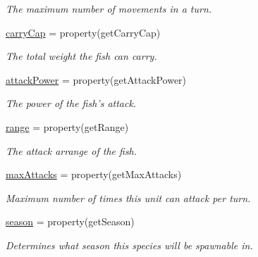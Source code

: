 \begin{DoxyCompactItemize}
\begin{DoxyCompactList}\small\item\em \-The maximum number of movements in a turn. \end{DoxyCompactList}\item 
\hypertarget{classGameObject_1_1Species_a9c90cc9e7bf6192beb2c2f91ffa0d22c}{\hyperlink{classGameObject_1_1Species_a9c90cc9e7bf6192beb2c2f91ffa0d22c}{carry\-Cap} = property(get\-Carry\-Cap)}\label{classGameObject_1_1Species_a9c90cc9e7bf6192beb2c2f91ffa0d22c}

\begin{DoxyCompactList}\small\item\em \-The total weight the fish can carry. \end{DoxyCompactList}\item 
\hypertarget{classGameObject_1_1Species_a327c9e875217d12671e8b277f4a89d71}{\hyperlink{classGameObject_1_1Species_a327c9e875217d12671e8b277f4a89d71}{attack\-Power} = property(get\-Attack\-Power)}\label{classGameObject_1_1Species_a327c9e875217d12671e8b277f4a89d71}

\begin{DoxyCompactList}\small\item\em \-The power of the fish's attack. \end{DoxyCompactList}\item 
\hypertarget{classGameObject_1_1Species_ae33e82d0ac7c38023b11d6eba9def115}{\hyperlink{classGameObject_1_1Species_ae33e82d0ac7c38023b11d6eba9def115}{range} = property(get\-Range)}\label{classGameObject_1_1Species_ae33e82d0ac7c38023b11d6eba9def115}

\begin{DoxyCompactList}\small\item\em \-The attack arrange of the fish. \end{DoxyCompactList}\item 
\hypertarget{classGameObject_1_1Species_a994e42d0a74aca7f8b3bbe27d25e037f}{\hyperlink{classGameObject_1_1Species_a994e42d0a74aca7f8b3bbe27d25e037f}{max\-Attacks} = property(get\-Max\-Attacks)}\label{classGameObject_1_1Species_a994e42d0a74aca7f8b3bbe27d25e037f}

\begin{DoxyCompactList}\small\item\em \-Maximum number of times this unit can attack per turn. \end{DoxyCompactList}\item 
\hypertarget{classGameObject_1_1Species_ab9c98ae1bcff53ebd86779c305dab3e4}{\hyperlink{classGameObject_1_1Species_ab9c98ae1bcff53ebd86779c305dab3e4}{season} = property(get\-Season)}\label{classGameObject_1_1Species_ab9c98ae1bcff53ebd86779c305dab3e4}

\begin{DoxyCompactList}\small\item\em \-Determines what season this species will be spawnable in. \end{DoxyCompactList}\end{DoxyCompactItemize}


